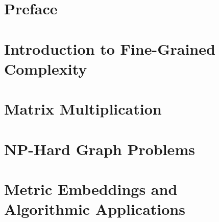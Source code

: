 \documentclass[oneside]{book}
\begin{document}
\pagebreak

\tableofcontents

\setcounter{tocdepth}{4}
\setcounter{secnumdepth}{4}

\pagebreak

\chapter*{Preface}



\mainmatter

\begin{savequote}
    
\end{savequote}
\chapter{Introduction to Fine-Grained Complexity}



\begin{savequote}
    
\end{savequote}
\chapter{Matrix Multiplication}



\begin{savequote}
    
\end{savequote}
\chapter{NP-Hard Graph Problems}



\begin{savequote}
    
\end{savequote}
\chapter{Metric Embeddings and Algorithmic Applications}



\chapter*{}
\end{document}
